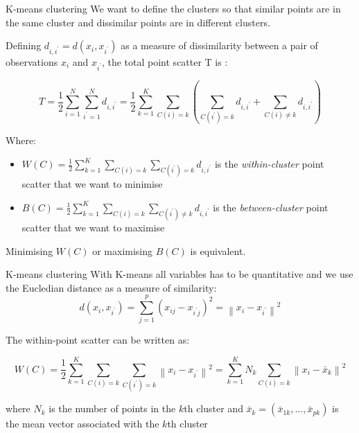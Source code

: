 \documentclass[notes]{beamer}          %
\newcommand{\norm}[1]{\left\lVert#1\right\rVert}
\providecommand{\norm}[1]{\lVert#1\rVert}
\begin{document}
\begin{frame}{K-means clustering}
We want to define the clusters so that similar points are in the same cluster and dissimilar points are in different clusters.

Defining $d_{i, i^\prime}=d(x_i, x_{i^\prime})$ as a measure of dissimilarity between a pair of observations $x_i$ and $x_{i^\prime}$, the total point scatter T is :

\begin{equation*}
	T = \frac{1}{2}  \sum_{i=1}^N \sum_{i^\prime=1}^N d_{i, i^\prime} = \frac{1}{2}  \sum_{k=1}^K \sum_{C(i)=k} (\sum_{C(i^\prime)=k} d_{i, i^\prime}  + \sum_{C(i) \neq k} d_{i, i^\prime})
\end{equation*}

Where:
\begin{itemize}
 \item $W(C) = \frac{1}{2} \sum_{k=1}^K \sum_{C(i)=k} \sum_{C(i^\prime)=k} d_{i, i^\prime}$ is the \textit{within-cluster} point scatter that we want to minimise
 \item $B(C) = \frac{1}{2} \sum_{k=1}^K \sum_{C(i)=k} \sum_{C(i^\prime) \neq k} d_{i, i^\prime}$ is the \textit{between-cluster} point scatter that we want to maximise
\end{itemize}

Minimising $W(C)$ or maximising $B(C)$ is equivalent.
\end{frame}

\begin{frame}{K-means clustering}
With K-means all variables has to be quantitative and we use the Eucledian distance as a measure of similarity:
\begin{equation*}
	d(x_i, x_{i^\prime}) = \sum_{j=1}^p (x_{ij} - x_{i^\prime j})^2 = \norm{x_{i} - x_{i^\prime} }^2
\end{equation*}

The within-point scatter can be written as:

\begin{equation*}
	W(C) = \frac{1}{2} \sum_{k=1}^K \sum_{C(i)=k} \sum_{C(i^\prime)=k} \norm{x_{i} - x_{i^\prime} }^2 = \sum_{k=1}^K N_k \sum_{C(i)=k}  \norm{x_{i} - \bar{x}_k }^2
\end{equation*}

where $N_k$ is the number of points in the $k$th cluster and $\bar{x}_k = (\bar{x}_{1k}, \dots, \bar{x}_{pk})$ is the mean vector associated with the $k$th cluster
\end{frame}
\end{document}
